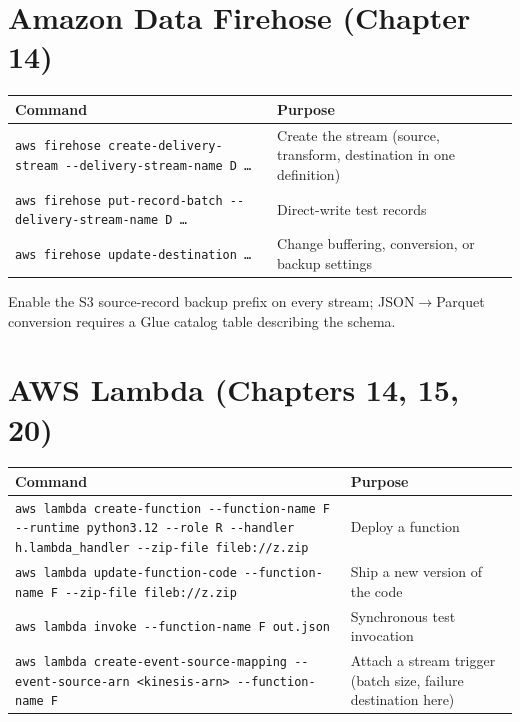 \section{Amazon Data Firehose (Chapter 14)}
%

\begin{center}
\footnotesize
\begin{tabular}{@{}p{7.2cm}p{7.6cm}@{}}
\toprule
\textbf{Command} & \textbf{Purpose} \\
\midrule
\texttt{aws firehose create-delivery-stream -{}-delivery-stream-name D \dots} & Create the stream (source, transform, destination in one definition) \\
\texttt{aws firehose put-record-batch -{}-delivery-stream-name D \dots} & Direct-write test records \\
\texttt{aws firehose update-destination \dots} & Change buffering, conversion, or backup settings \\
\bottomrule
\end{tabular}
\end{center}

\noindent Enable the S3 source-record backup prefix on every stream; JSON$\rightarrow$Parquet
conversion requires a Glue catalog table describing the schema.

\section{AWS Lambda (Chapters 14, 15, 20)}
%

\begin{center}
\footnotesize
\begin{tabular}{@{}p{7.2cm}p{7.6cm}@{}}
\toprule
\textbf{Command} & \textbf{Purpose} \\
\midrule
\texttt{aws lambda create-function -{}-function-name F -{}-runtime python3.12 -{}-role R -{}-handler h.lambda\_handler -{}-zip-file fileb://z.zip} & Deploy a function \\
\texttt{aws lambda update-function-code -{}-function-name F -{}-zip-file fileb://z.zip} & Ship a new version of the code \\
\texttt{aws lambda invoke -{}-function-name F out.json} & Synchronous test invocation \\
\texttt{aws lambda create-event-source-mapping -{}-event-source-arn <kinesis-arn> -{}-function-name F} & Attach a stream trigger (batch size, failure destination here) \\
\bottomrule
\end{tabular}
\end{center}

